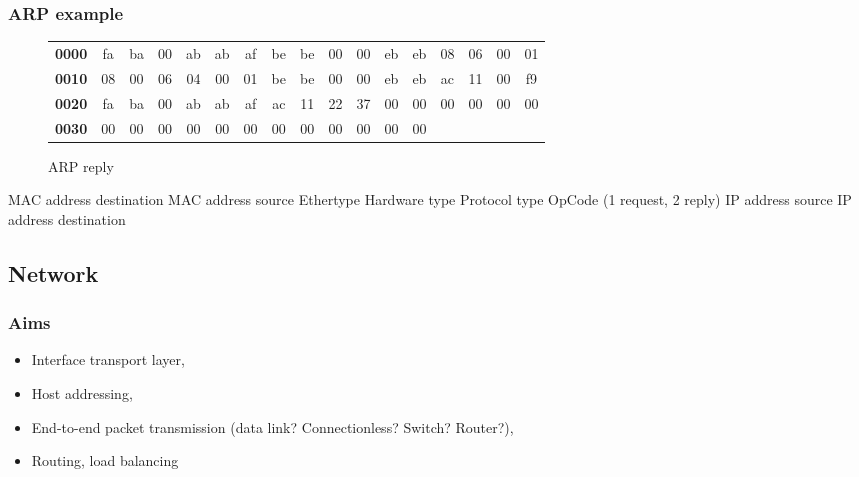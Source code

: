   \begin{frame}
    \frametitle{ARP example}
      \begin{figure}
      \centering
      \resizebox{11.5cm}{!} {
        \begin{tabular}{lcccccccccccccccc}
          \textbf{0000} & \color{red}fa & \color{red}ba & \color{red}00 & \color{red}ab & \color{red}ab & \color{red}af & \color{Marroon}be & \color{Marroon}be & \color{Marroon}00 & \color{Marroon}00 & \color{Marroon}eb & \color{Marroon}eb & \color{blue}08 & \color{blue}06 & \color{magenta}00 & \color{magenta}01 \\
          \textbf{0010} & \color{OliveGreen}08 & \color{OliveGreen}00 & \color{gray}06 & \color{gray}04 & \color{fuchsia}00 & \color{fuchsia}01 & \color{Marroon}be & \color{Marroon}be & \color{Marroon}00 & \color{Marroon}00 & \color{Marroon}eb & \color{Marroon}eb & \color{brown}ac & \color{brown}11 & \color{brown}00 & \color{brown}f9 \\
          \textbf{0020} & \color{red}fa & \color{red}ba & \color{red}00 & \color{red}ab & \color{red}ab & \color{red}af & \color{orange}ac & \color{orange}11 & \color{orange}22 & \color{orange}37 & 00 & 00 & 00 & 00 & 00 & 00 \\
          \textbf{0030} & 00 & 00 & 00 & 00 & 00 & 00 & 00 & 00 & 00 & 00 & 00 & 00 \\
        \end{tabular}
      }
      \caption{ARP reply}
      \label{fig:arp_rep_ex-colored}
    \end{figure}
    \color{red}MAC address destination \color{Marroon}MAC address source \color{blue}Ethertype \color{magenta}Hardware type \color{OliveGreen}Protocol type \color{fuchsia}OpCode (1 request, 2 reply) \color{brown} IP address source \color{orange} IP address destination
  \end{frame}

  \subsection{Network}
  \begin{frame}
    \frametitle{Aims}
      \begin{itemize}
        \item Interface transport layer,\pause
	\item Host addressing,\pause
        \item End-to-end packet transmission (data link? Connectionless? Switch? Router?),\pause
        \item Routing, load balancing
      \end{itemize}
  \end{frame}
